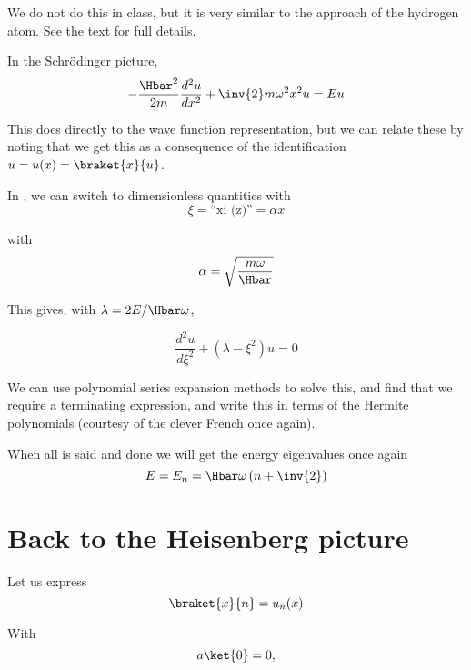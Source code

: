 We do not do this in class, but it is very similar to the approach of the hydrogen atom.  See the text for full details.

In the Schr\"{o}dinger picture,
\begin{equation}\label{eqn:PHY356FLecture11:400}
-\frac{\Hbar^2}{2m} \frac{d^2 u}{dx^2} + \inv{2} m \omega^2 x^2 u = E u
\end{equation}

This does directly to the wave function representation, but we can relate these by noting that we get this as a consequence of the identification \(u = u(x) = \braket{x}{u}\).

In , we can switch to dimensionless quantities with
\begin{equation}\label{eqn:PHY356FLecture11:410}
\xi = \text{``xi (z)''} = \alpha x
\end{equation}

with
\begin{equation}\label{eqn:PHY356FLecture11:411}
\alpha = \sqrt{\frac{m \omega}{\Hbar}}
\end{equation}

This gives, with \(\lambda = 2E/\Hbar\omega\),

\begin{equation}\label{eqn:PHY356FLecture11:420}
\frac{d^2 u}{d\xi^2} + (\lambda - \xi^2) u = 0
\end{equation}

We can use polynomial series expansion methods to solve this, and find that we require a terminating expression, and write this in terms of the Hermite polynomials (courtesy of the clever French once again).

When all is said and done we will get the energy eigenvalues once again
\begin{equation}\label{eqn:PHY356FLecture11:430}
E = E_n = \Hbar \omega \left( n + \inv{2} \right)
\end{equation}

\section{Back to the Heisenberg picture}

Let us express
\begin{equation}\label{eqn:PHY356FLecture11:500}
\braket{x}{n} = u_n(x)
\end{equation}

With
\begin{equation}\label{eqn:PHY356FLecture11:510}
a \ket{0} = 0,
\end{equation}

